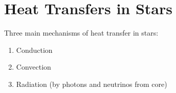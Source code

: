 \chapter{Heat Transfers in Stars}

Three main mechanisms of heat transfer in stars:
\begin{enumerate}
    \item Conduction
    \item Convection
    \item Radiation (by photons and neutrinos from core)
\end{enumerate}